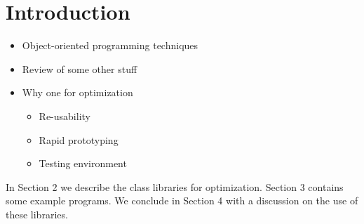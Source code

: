 \section{Introduction}

\begin{itemize}
\item Object-oriented programming techniques
\item Review of some other stuff
\item Why one for optimization
\begin{itemize} 
\item Re-usability
\item Rapid prototyping
\item Testing environment
\end{itemize}
\end{itemize}

In Section 2 we describe the class libraries for optimization. Section
3 contains some example programs. We
conclude in Section 4 with a discussion on the use of these libraries.



